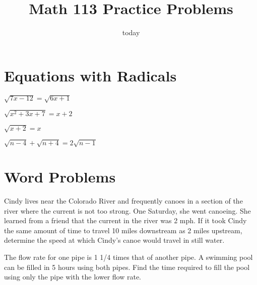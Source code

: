 \documentclass[fleqn,addpoints]{exam}
\title{Math 113 Practice Problems}
\author{}
\date{today}
\begin{document}
\maketitle

\begin{questions}

\section{Equations with Radicals}

\question \( \sqrt{7x-12} = \sqrt{6x+1} \) 
\vspace{1.5 in}

\question \( \sqrt{x^2 + 3x + 7} = x+2 \) 
\vspace{1.5 in}

\question \( \sqrt{x+2} = x \) 
\vspace{1.5 in}

\question \( \sqrt{n-4} + \sqrt{n+4} = 2\sqrt{n-1} \) 
\vspace{1.5 in}

\section{Word Problems}

\question Cindy lives near the Colorado River and frequently canoes in a section of the river where the current is not
too strong.  One Saturday, she went canoeing.  She learned from a friend that the current in the river was 2 mph.  If it
took Cindy the same amount of time to travel 10 miles downstream as 2 miles upstream, determine the speed at which
Cindy's canoe would travel in still water.
\vspace{3.5 in}

\question The flow rate for one pipe is 1 1/4 times that of another pipe.  A swimming pool can be filled in 5 hours
using both pipes.  Find the time required to fill the pool using only the pipe with the lower flow rate.
\vspace{3 in}


\end{questions}
\end{document}
